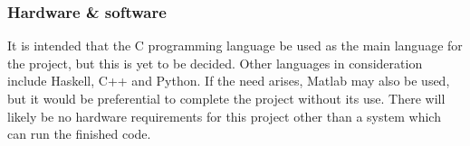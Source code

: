 \documentclass{article}
\begin{document}
\subsubsection*{Hardware \& software}

It is intended that the C programming language be used as the main language for the project, but this is yet to be decided. Other languages in consideration include Haskell, C++ and Python. If the need arises, Matlab may also be used, but it would be preferential to complete the project without its use. There will likely be no hardware requirements for this project other than a system which can run the finished code.

\printbibliography
\end{document}

